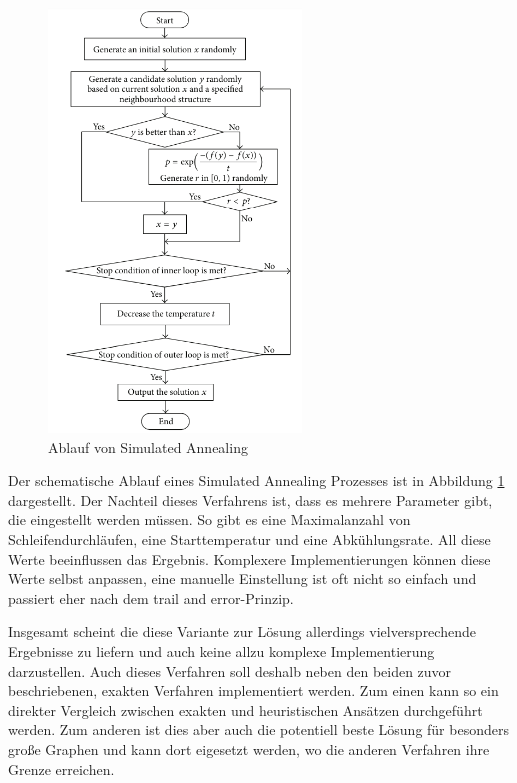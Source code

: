 \begin{figure}[H]
    \centering
    \includegraphics[width=0.6\textwidth]{images/flowSimulatedAnnealing.png}
    \caption{Ablauf von Simulated Annealing \cite{tspSimulatedAnnealing}}
    \label{fig:flowchart_simulated_annealing}
\end{figure}

Der schematische Ablauf eines Simulated Annealing Prozesses ist in Abbildung \ref{fig:flowchart_simulated_annealing} dargestellt. Der Nachteil dieses Verfahrens ist, dass es mehrere Parameter gibt, die eingestellt werden müssen. So gibt es eine Maximalanzahl von Schleifendurchläufen, eine Starttemperatur und eine Abkühlungsrate. All diese Werte beeinflussen das Ergebnis. Komplexere Implementierungen können diese Werte selbst anpassen, eine manuelle Einstellung ist oft nicht so einfach und passiert eher nach dem \glqq{}trail and error\grqq{}-Prinzip. \cite{tspSimulatedAnnealing}

Insgesamt scheint die diese Variante zur Lösung allerdings vielversprechende Ergebnisse zu liefern und auch keine allzu komplexe Implementierung darzustellen. Auch dieses Verfahren soll deshalb neben den beiden zuvor beschriebenen, exakten Verfahren implementiert werden. Zum einen kann so ein direkter Vergleich zwischen exakten und heuristischen Ansätzen durchgeführt werden. Zum anderen ist dies aber auch die potentiell beste Lösung für besonders große Graphen und kann dort eigesetzt werden, wo die anderen Verfahren ihre Grenze erreichen.


